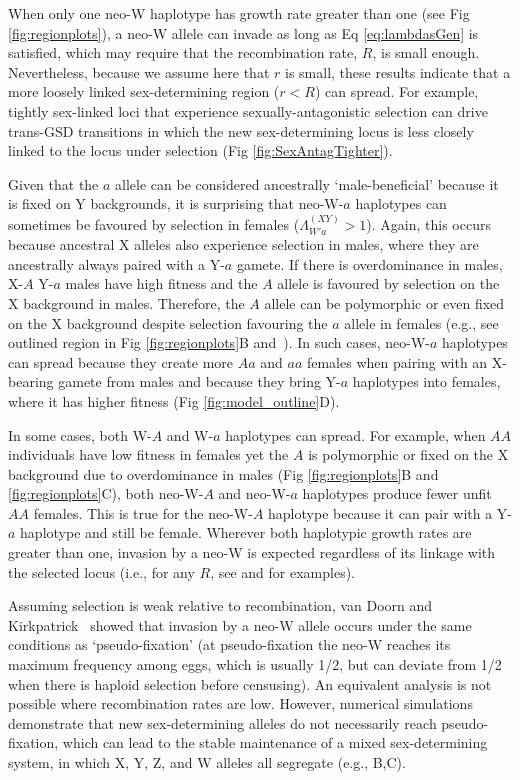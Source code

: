 \documentclass[10pt,letterpaper]{article}
\begin{document}

When only one neo-W haplotype has growth rate greater than one (see Fig \ref{fig:regionplots}), a neo-W allele can invade as long as Eq \eqref{eq:lambdasGen} is satisfied, which may require that the recombination rate, $R$, is small enough.
Nevertheless, because we assume here that $r$ is small, these results indicate that a more loosely linked sex-determining region ($r<R$) can spread.
For example, tightly sex-linked loci that experience sexually-antagonistic selection can drive trans-GSD transitions in which the new sex-determining locus is less closely linked to the locus under selection (Fig \ref{fig:SexAntagTighter}). 

Given that the $a$ allele can be considered ancestrally `male-beneficial' because it is fixed on Y backgrounds, it is surprising that neo-W-$a$ haplotypes can sometimes be favoured by selection in females ($\Lambda_{W'a}^{(XY)}>1$). 
Again, this occurs because ancestral X alleles also experience selection in males, where they are ancestrally always paired with a Y-$a$ gamete. 
If there is overdominance in males, X-$A$ Y-$a$ males have high fitness and the $A$ allele is favoured by selection on the X background in males. 
Therefore, the $A$ allele can be polymorphic or even fixed on the X background despite selection favouring the $a$ allele in females (e.g., see outlined region in Fig \ref{fig:regionplots}B and~\cite{Lloyd1977,Otto2014}). 
In such cases, neo-W-$a$ haplotypes can spread because they create more $Aa$ and $aa$ females when pairing with an X-bearing gamete from males and because they bring Y-$a$ haplotypes into females, where it has higher fitness (Fig \ref{fig:model_outline}D). 

In some cases, both W-$A$ and W-$a$ haplotypes can spread.
For example, when $AA$ individuals have low fitness in females yet the $A$ is polymorphic or fixed on the X background due to overdominance in males (Fig \ref{fig:regionplots}B and \ref{fig:regionplots}C), both neo-W-$A$ and neo-W-$a$ haplotypes produce fewer unfit $AA$ females.
This is true for the neo-W-$A$ haplotype because it can pair with a Y-$a$ haplotype and still be female. 
Wherever both haplotypic growth rates are greater than one, invasion by a neo-W is expected regardless of its linkage with the selected locus (i.e., for any $R$, see  and  for examples). 

Assuming selection is weak relative to recombination, van Doorn and Kirkpatrick~\cite{vanDoorn:2010hu} showed that invasion by a neo-W allele occurs under the same conditions as `pseudo-fixation' (at pseudo-fixation the neo-W reaches its maximum frequency among eggs, which is usually 1/2, but can deviate from 1/2 when there is haploid selection before censusing). 
An equivalent analysis is not possible where recombination rates are low. 
However, numerical simulations demonstrate that new sex-determining alleles do not necessarily reach pseudo-fixation, which can lead to the stable maintenance of a mixed sex-determining system, in which X, Y, Z, and W alleles all segregate (e.g., B,C). 
\end{document}
